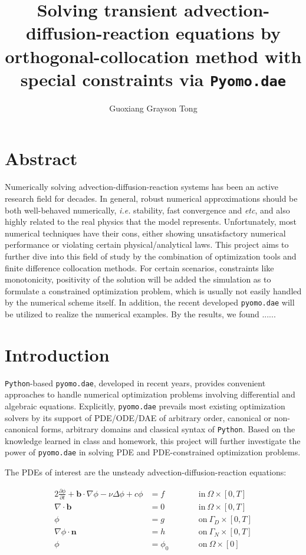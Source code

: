 \documentclass{article}
\title{Solving transient advection-diffusion-reaction equations by orthogonal-collocation method with special constraints via \texttt{Pyomo.dae}}
\author[1]{Guoxiang Grayson Tong}
\affil[1]{Ph.D. student, 
Department of Applied and Computational Mathematics and Statistics
}
\date{}
\begin{document}
\maketitle
\section{Abstract}
Numerically solving advection-diffusion-reaction systems has been an active research field for decades. In general, robust numerical approximations should be both well-behaved numerically, {\it{i.e.}} stability, fast convergence and {\it{etc}}, and also highly related to the real physics that the model represents. Unfortunately, most numerical techniques have their cons, either showing unsatisfactory numerical performance or violating certain physical/analytical laws. This project aims to further dive into this field of study by the combination of optimization tools and finite difference collocation methods. For certain scenarios, constraints like monotonicity, positivity of the solution will be added the simulation as to formulate a constrained optimization problem, which is usually not easily handled by the numerical scheme itself. In addition, the recent developed \texttt{pyomo.dae} will be utilized to realize the numerical examples. By the results, we found ......
\section{Introduction}
\indent \texttt{Python}-based \texttt{pyomo.dae}\cite{nicholson2018pyomo}, developed in recent years, provides convenient approaches to handle numerical optimization problems involving differential and algebraic equations. Explicitly, \texttt{pyomo.dae} prevails most existing optimization solvers by its support of PDE/ODE/DAE of arbitrary order, canonical or non-canonical forms, arbitrary domains and classical syntax of \texttt{Python}. Based on the knowledge learned in class and homework, this project will further investigate the power of \texttt{pyomo.dae} in solving PDE and PDE-constrained optimization problems.\par

\indent The PDEs of interest are the unsteady advection-diffusion-reaction equations:

\begin{alignat*}{2}
\displaystyle {\frac{\partial \phi}{\partial t}}  +  \mathbf{b} \cdot \nabla \phi - \nu \Delta \phi + c\phi &=f \quad \quad &&\text{in} \ \Omega \times [0,T]\\
\nabla \cdot \mathbf{b} &= 0 \quad \quad &&\text{in} \ \Omega \times [0,T] \\
\phi &= g \quad \quad &&\text{on} \ \Gamma_D \times [0,T] \\
\nabla \phi \cdot \mathbf{n} &= h \quad \quad &&\text{on} \ \Gamma_N \times [0,T]\\
\phi &= \phi_0 \quad \quad && \text{on} \ \Omega \times [0]
\end{alignat*}
\end{document}
